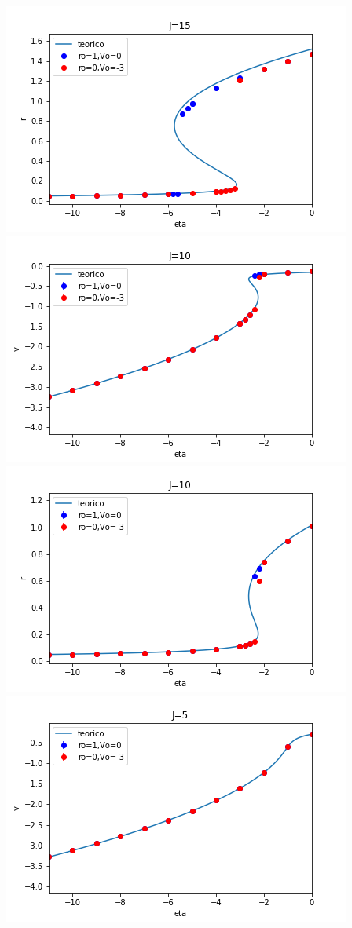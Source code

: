 \documentclass[a4paper]{article}
\begin{document}
\includegraphics[scale=0.7]{r_vs_eta_J15.png}\\
\includegraphics[scale=0.7]{v_vs_eta_J10.png}\\
\includegraphics[scale=0.7]{r_vs_eta_J10.png}\\
\includegraphics[scale=0.7]{v_vs_eta_J5.png}\\
\end{document}

